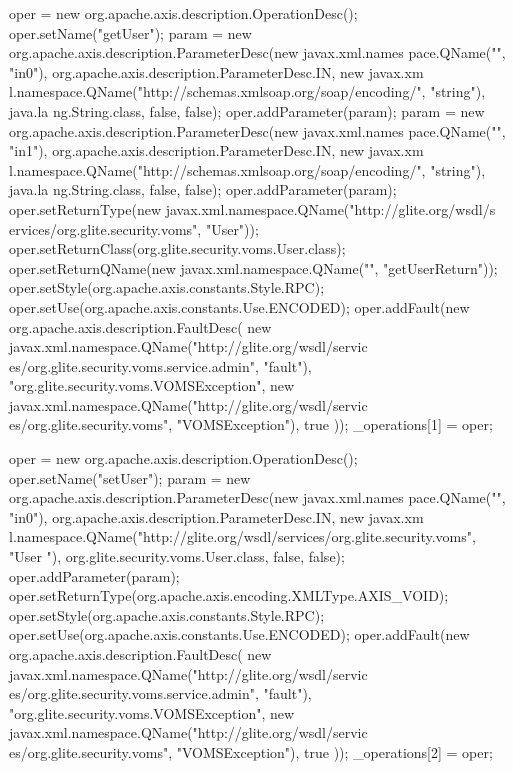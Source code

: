 \begin{DoxyCode}
{        oper = new org.apache.axis.description.OperationDesc();
        oper.setName("getUser");
        param = new org.apache.axis.description.ParameterDesc(new javax.xml.names
      pace.QName("", "in0"), org.apache.axis.description.ParameterDesc.IN, new javax.xm
      l.namespace.QName("http://schemas.xmlsoap.org/soap/encoding/", "string"), java.la
      ng.String.class, false, false);
        oper.addParameter(param);
        param = new org.apache.axis.description.ParameterDesc(new javax.xml.names
      pace.QName("", "in1"), org.apache.axis.description.ParameterDesc.IN, new javax.xm
      l.namespace.QName("http://schemas.xmlsoap.org/soap/encoding/", "string"), java.la
      ng.String.class, false, false);
        oper.addParameter(param);
        oper.setReturnType(new javax.xml.namespace.QName("http://glite.org/wsdl/s
      ervices/org.glite.security.voms", "User"));
        oper.setReturnClass(org.glite.security.voms.User.class);
        oper.setReturnQName(new javax.xml.namespace.QName("", "getUserReturn"));
        oper.setStyle(org.apache.axis.constants.Style.RPC);
        oper.setUse(org.apache.axis.constants.Use.ENCODED);
        oper.addFault(new org.apache.axis.description.FaultDesc(
                      new javax.xml.namespace.QName("http://glite.org/wsdl/servic
      es/org.glite.security.voms.service.admin", "fault"),
                      "org.glite.security.voms.VOMSException",
                      new javax.xml.namespace.QName("http://glite.org/wsdl/servic
      es/org.glite.security.voms", "VOMSException"), 
                      true
                     ));
        _operations[1] = oper;

        oper = new org.apache.axis.description.OperationDesc();
        oper.setName("setUser");
        param = new org.apache.axis.description.ParameterDesc(new javax.xml.names
      pace.QName("", "in0"), org.apache.axis.description.ParameterDesc.IN, new javax.xm
      l.namespace.QName("http://glite.org/wsdl/services/org.glite.security.voms", "User
      "), org.glite.security.voms.User.class, false, false);
        oper.addParameter(param);
        oper.setReturnType(org.apache.axis.encoding.XMLType.AXIS_VOID);
        oper.setStyle(org.apache.axis.constants.Style.RPC);
        oper.setUse(org.apache.axis.constants.Use.ENCODED);
        oper.addFault(new org.apache.axis.description.FaultDesc(
                      new javax.xml.namespace.QName("http://glite.org/wsdl/servic
      es/org.glite.security.voms.service.admin", "fault"),
                      "org.glite.security.voms.VOMSException",
                      new javax.xml.namespace.QName("http://glite.org/wsdl/servic
      es/org.glite.security.voms", "VOMSException"), 
                      true
                     ));
        _operations[2] = oper;

}
\end{DoxyCode}
